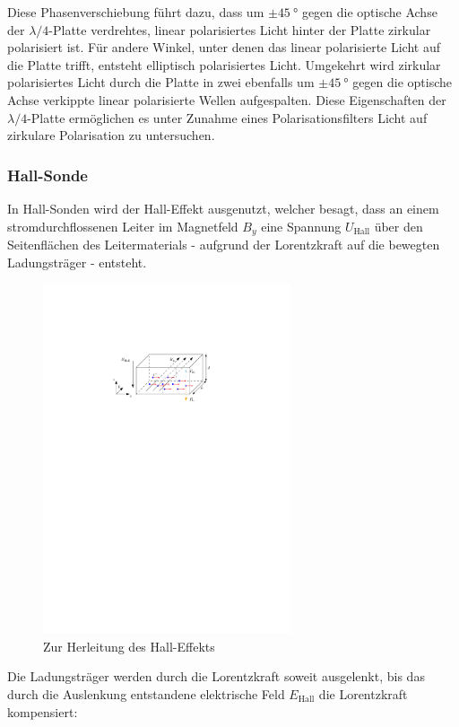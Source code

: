 \documentclass[11pt, a4paper]{article}
\begin{document}
Diese Phasenverschiebung führt dazu, dass um $\pm\SI{45}{\degree}$ gegen die optische Achse der $\lambda/4$-Platte verdrehtes, linear polarisiertes Licht hinter der Platte zirkular polarisiert ist.
Für andere Winkel, unter denen das linear polarisierte Licht auf die Platte trifft, entsteht elliptisch polarisiertes Licht.
Umgekehrt wird zirkular polarisiertes Licht durch die Platte in zwei ebenfalls um $\pm\SI{45}{\degree}$ gegen die optische Achse verkippte linear polarisierte Wellen aufgespalten.
Diese Eigenschaften der $\lambda/4$-Platte ermöglichen es unter Zunahme eines Polarisationsfilters Licht auf zirkulare Polarisation zu untersuchen.

\subsubsection{Hall-Sonde}
In Hall-Sonden wird der Hall-Effekt ausgenutzt, welcher besagt, dass an einem stromdurchflossenen Leiter im Magnetfeld $B_y$ eine Spannung $U_\mathrm{Hall}$ über den Seitenflächen des Leitermaterials - aufgrund der Lorentzkraft auf die bewegten Ladungsträger - entsteht.
\begin{figure}[h]
	\centering
	\includegraphics[width=0.65\textwidth]{./figures/hall_effekt.pdf}
	\caption{Zur Herleitung des Hall-Effekts}
	\label{fig:hall_effekt}
\end{figure}
Die Ladungsträger werden durch die Lorentzkraft soweit ausgelenkt, bis das durch die Auslenkung entstandene elektrische Feld $E_\mathrm{Hall}$ die Lorentzkraft kompensiert:
\end{document}
